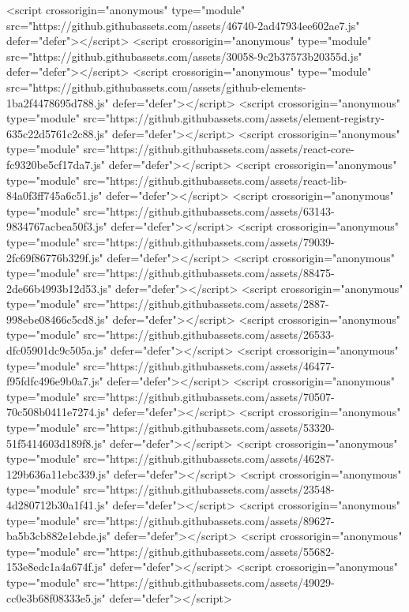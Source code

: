<script crossorigin="anonymous" type="module" src="https://github.githubassets.com/assets/46740-2ad47934ee602ae7.js" defer="defer"></script>
<script crossorigin="anonymous" type="module" src="https://github.githubassets.com/assets/30058-9c2b37573b20355d.js" defer="defer"></script>
<script crossorigin="anonymous" type="module" src="https://github.githubassets.com/assets/github-elements-1ba2f4478695d788.js" defer="defer"></script>
<script crossorigin="anonymous" type="module" src="https://github.githubassets.com/assets/element-registry-635c22d5761c2c88.js" defer="defer"></script>
<script crossorigin="anonymous" type="module" src="https://github.githubassets.com/assets/react-core-fc9320be5cf17da7.js" defer="defer"></script>
<script crossorigin="anonymous" type="module" src="https://github.githubassets.com/assets/react-lib-84a0f3ff745a6c51.js" defer="defer"></script>
<script crossorigin="anonymous" type="module" src="https://github.githubassets.com/assets/63143-9834767acbea50f3.js" defer="defer"></script>
<script crossorigin="anonymous" type="module" src="https://github.githubassets.com/assets/79039-2fc69f86776b329f.js" defer="defer"></script>
<script crossorigin="anonymous" type="module" src="https://github.githubassets.com/assets/88475-2de66b4993b12d53.js" defer="defer"></script>
<script crossorigin="anonymous" type="module" src="https://github.githubassets.com/assets/2887-998ebe08466c5cd8.js" defer="defer"></script>
<script crossorigin="anonymous" type="module" src="https://github.githubassets.com/assets/26533-dfc05901dc9c505a.js" defer="defer"></script>
<script crossorigin="anonymous" type="module" src="https://github.githubassets.com/assets/46477-f95fdfc496e9b0a7.js" defer="defer"></script>
<script crossorigin="anonymous" type="module" src="https://github.githubassets.com/assets/70507-70c508b0411e7274.js" defer="defer"></script>
<script crossorigin="anonymous" type="module" src="https://github.githubassets.com/assets/53320-51f5414603d189f8.js" defer="defer"></script>
<script crossorigin="anonymous" type="module" src="https://github.githubassets.com/assets/46287-129b636a11ebc339.js" defer="defer"></script>
<script crossorigin="anonymous" type="module" src="https://github.githubassets.com/assets/23548-4d280712b30a1f41.js" defer="defer"></script>
<script crossorigin="anonymous" type="module" src="https://github.githubassets.com/assets/89627-ba5b3cb882e1ebde.js" defer="defer"></script>
<script crossorigin="anonymous" type="module" src="https://github.githubassets.com/assets/55682-153e8edc1a4a674f.js" defer="defer"></script>
<script crossorigin="anonymous" type="module" src="https://github.githubassets.com/assets/49029-cc0e3b68f08333e5.js" defer="defer"></script>
